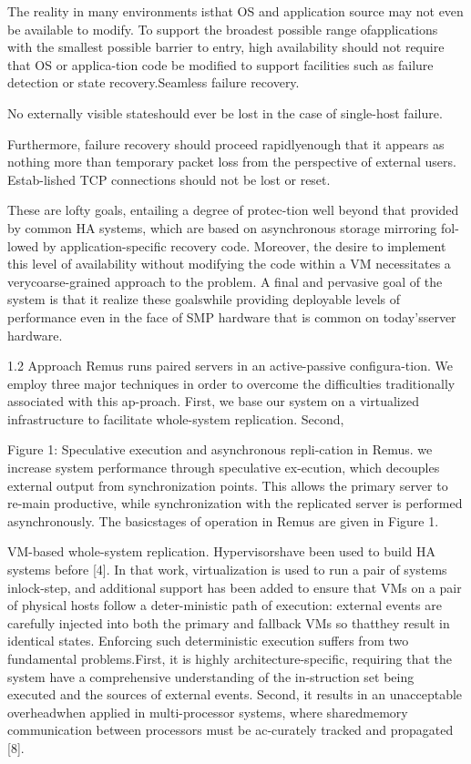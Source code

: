 The reality in many environments isthat OS and application source may not even be available to modify. To support the broadest possible range ofapplications with the smallest possible barrier to entry,
high availability should not require that OS or applica-tion code be modified to support facilities such as failure
detection or state recovery.Seamless failure recovery.

No externally visible stateshould ever be lost in the case of single-host failure.

Furthermore, failure recovery should proceed rapidlyenough that it appears as nothing more than temporary
packet loss from the perspective of external users. Estab-lished TCP connections should not be lost or reset.

These are lofty goals, entailing a degree of protec-tion well beyond that provided by common HA systems,
which are based on asynchronous storage mirroring fol-lowed by application-specific recovery code. Moreover,
the desire to implement this level of availability without modifying the code within a VM necessitates a verycoarse-grained approach to the problem. A final and pervasive goal of the system is that it realize these goalswhile providing deployable levels of performance even
in the face of SMP hardware that is common on today'sserver hardware.

1.2 Approach
Remus runs paired servers in an active-passive configura-tion. We employ three major techniques in order to overcome the difficulties traditionally associated with this ap-proach. First, we base our system on a virtualized infrastructure to facilitate whole-system replication. Second,

Figure 1: Speculative execution and asynchronous repli-cation in Remus.
we increase system performance through speculative ex-ecution, which decouples external output from synchronization points. This allows the primary server to re-main productive, while synchronization with the replicated server is performed asynchronously. The basicstages of operation in Remus are given in Figure 1.

VM-based whole-system replication. Hypervisorshave been used to build HA systems before [4]. In that
work, virtualization is used to run a pair of systems inlock-step, and additional support has been added to ensure that VMs on a pair of physical hosts follow a deter-ministic path of execution: external events are carefully
injected into both the primary and fallback VMs so thatthey result in identical states. Enforcing such deterministic execution suffers from two fundamental problems.First, it is highly architecture-specific, requiring that the
system have a comprehensive understanding of the in-struction set being executed and the sources of external
events. Second, it results in an unacceptable overheadwhen applied in multi-processor systems, where sharedmemory communication between processors must be ac-curately tracked and propagated [8].

